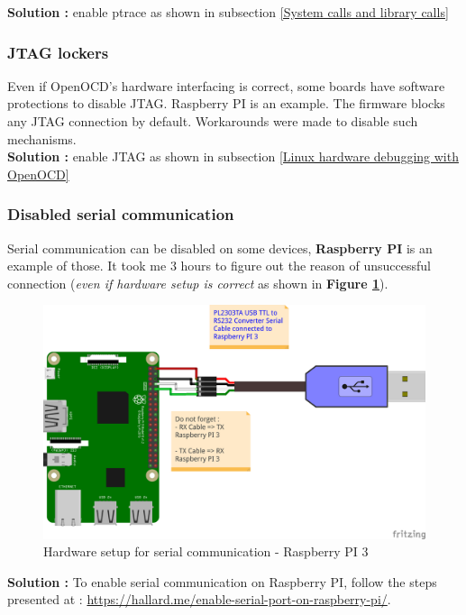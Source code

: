 \textbf{\color{orange}Solution : } enable ptrace as shown in {\color{red}subsection {\color{blue}\ref{System calls and library calls}}}
\subsubsection{JTAG lockers}
Even if OpenOCD's hardware interfacing is correct, some boards have software protections to disable JTAG. Raspberry PI is an example. The firmware blocks any JTAG connection by default. Workarounds were made to disable such mechanisms.\\

\textbf{\color{orange}Solution : } enable JTAG as shown in {\color{red}subsection {\color{blue}\ref{Linux hardware debugging with OpenOCD}}}
\subsubsection{Disabled serial communication}
Serial communication can be disabled on some devices, \textbf{Raspberry PI} is an example of those. It took me 3 hours to figure out the reason of unsuccessful connection (\textit{even if hardware setup is correct} as shown in \textbf{Figure \ref{Hardware setup for serial communication - Raspberry PI 3}}). 


\begin{figure}[H]
		\centering
        \includegraphics[scale=0.40]{img/issues/USB-Serial-cable-To-Raspberry-PI-3_bb.png}
        \caption{Hardware setup for serial communication - Raspberry PI 3}
        \label{Hardware setup for serial communication - Raspberry PI 3}
    \end{figure}



\textbf{\color{orange}Solution : } To enable serial communication on Raspberry PI, follow the steps presented at : {\color{blue}\url{https://hallard.me/enable-serial-port-on-raspberry-pi/}}.

